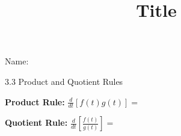 \documentclass[12pt]{article}
\title{Title}
\begin{document}

 Name:
 \begin{center}\large{3.3 Product and Quotient Rules}\end{center}


\begin{tcolorbox}

\textbf{Product Rule:} $\displaystyle \frac{d}{dt} \left[f(t)g(t)\right]=$\\
\vspace{10mm}

\textbf{Quotient Rule:} $\displaystyle \frac{d}{dt} \left[\frac{f(t)}{g(t)}\right]=$\\
 \vspace{5mm}

\end{tcolorbox}
\end{document}
